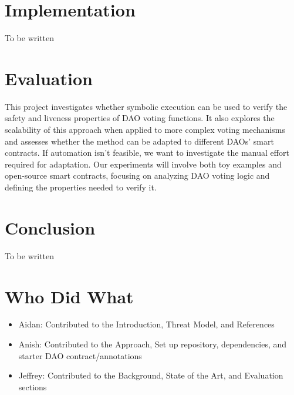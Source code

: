\documentclass[conference]{IEEEtran}
\begin{document}
\section{Implementation}
To be written


\section{Evaluation}

This project investigates whether symbolic execution can be used to verify the safety and liveness properties of DAO voting functions. It also explores the scalability of this approach when applied to more complex voting mechanisms and assesses whether the method can be adapted to different DAOs' smart contracts. If automation isn't feasible, we want to investigate the manual effort required for adaptation. Our experiments will involve both toy examples and open-source smart contracts, focusing on analyzing DAO voting logic and defining the properties needed to verify it.

\section{Conclusion}
To be written

\section{Who Did What}
\begin{itemize}
    \item Aidan: Contributed to the Introduction, Threat Model, and References
    \item Anish: Contributed to the Approach, Set up repository, dependencies, and starter DAO contract/annotations
    \item Jeffrey: Contributed to the Background, State of the Art, and Evaluation sections
\end{itemize}
\end{document}
